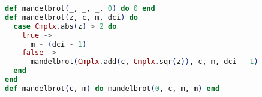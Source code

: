 \begin{lstlisting}[language=Elixir]
def mandelbrot(_, _, _, 0) do 0 end
def mandelbrot(z, c, m, dci) do
  case Cmplx.abs(z) > 2 do
    true ->
      m - (dci - 1)
    false ->
      mandelbrot(Cmplx.add(c, Cmplx.sqr(z)), c, m, dci - 1)
  end
end
def mandelbrot(c, m) do mandelbrot(0, c, m, m) end
\end{lstlisting}